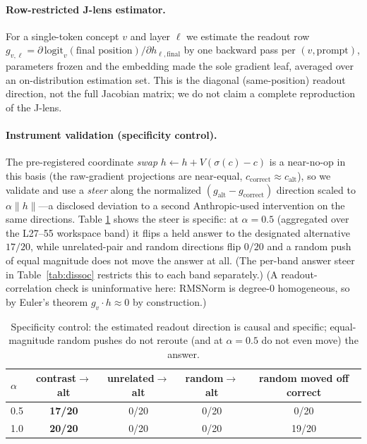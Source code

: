 \documentclass[11pt]{article}
\begin{document}
\paragraph{Row-restricted J-lens estimator.} For a single-token concept $v$ and layer $\ell$ we
estimate the readout row $g_{v,\ell} = \partial\,\mathrm{logit}_v(\text{final position})/\partial
h_{\ell,\text{final}}$ by one backward pass per $(v,\text{prompt})$, parameters frozen and the
embedding made the sole gradient leaf, averaged over an on-distribution estimation set. This is the
diagonal (same-position) readout direction, not the full Jacobian matrix; we do not claim a complete
reproduction of the J-lens.

\paragraph{Instrument validation (specificity control).} The pre-registered coordinate \emph{swap}
$h \leftarrow h + V(\sigma(c)-c)$ is a near-no-op in this basis (the raw-gradient projections are
near-equal, $c_{\text{correct}}\approx c_{\text{alt}}$), so we validate and use a \emph{steer} along
the normalized $(g_{\text{alt}}-g_{\text{correct}})$ direction scaled to $\alpha\lVert h\rVert$---a
disclosed deviation to a second Anthropic-used intervention on the same directions. Table
\ref{tab:spec} shows the steer is specific: at $\alpha{=}0.5$ (aggregated over the L27--55 workspace
band) it flips a held answer to the designated alternative $17/20$, while unrelated-pair and random
directions flip $0/20$ and a random push of equal magnitude does not move the answer at all. (The
per-band answer steer in Table~\ref{tab:dissoc} restricts this to each band separately.) (A readout-correlation check is uninformative here:
RMSNorm is degree-0 homogeneous, so by Euler's theorem $g_v\!\cdot h \approx 0$ by construction.)

\begin{table}[h]\centering\small
\begin{tabular}{lcccc}
\toprule
$\alpha$ & contrast$\rightarrow$alt & unrelated$\rightarrow$alt & random$\rightarrow$alt & random moved off correct \\
\midrule
0.5 & \textbf{17/20} & 0/20 & 0/20 & 0/20 \\
1.0 & \textbf{20/20} & 0/20 & 0/20 & 19/20 \\
\bottomrule
\end{tabular}
\caption{Specificity control: the estimated readout direction is causal and specific; equal-magnitude
random pushes do not reroute (and at $\alpha{=}0.5$ do not even move) the answer.}
\label{tab:spec}
\end{table}
\end{document}
